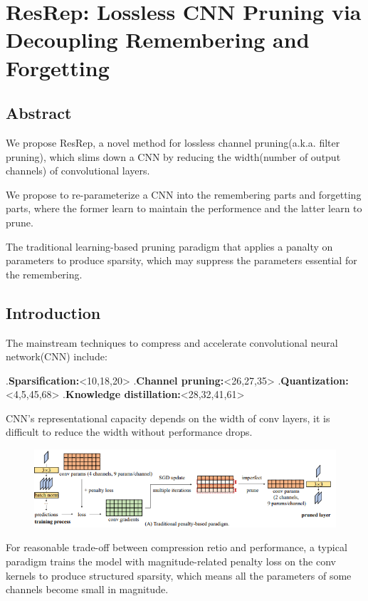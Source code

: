 \documentclass[11pt]{article}
\begin{document}
\section{ResRep: Lossless CNN Pruning via Decoupling Remembering and Forgetting}
\subsection{Abstract}
We propose ResRep, a novel method for lossless channel pruning(a.k.a. filter pruning), which slims down a CNN by reducing the width(number of output channels) of convolutional layers.

We propose to re-parameterize a CNN into the remembering parts and forgetting parts, where the former learn to maintain the performence and the latter learn to prune.

The traditional learning-based pruning paradigm that applies a panalty on parameters to produce sparsity, which may suppress the parameters essential for the remembering.
\subsection{Introduction}
The mainstream techniques to compress and accelerate convolutional neural network(CNN) include:

.\textbf{Sparsification:}<10,18,20>
.\textbf{Channel pruning:}<26,27,35>
.\textbf{Quantization:}<4,5,45,68>
.\textbf{Knowledge distillation:}<28,32,41,61>

CNN's representational capacity depends on the width of conv layers, it is difficult to reduce the width without performance drops.

\begin{figure}[H]
	\centering
	\includegraphics[scale = 0.35]{92}
\end{figure}

For reasonable trade-off between compression retio and performance, a typical paradigm trains the model with magnitude-related penalty loss on the conv kernels to produce structured sparsity, which means all the parameters of some channels become small in magnitude.
\end{document}
